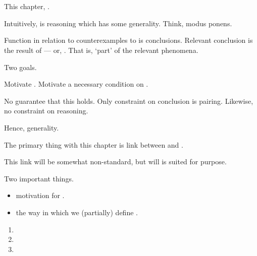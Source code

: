 \chapter{}
\label{cha:typical}

\begin{note}
  This chapter, \tR{}.

  Intuitively, \tR{} is reasoning which has some generality.
  Think, modus ponens.
\end{note}

\begin{note}
  Function in relation to counterexamples to \issueConstraint{} is conclusions.
  Relevant conclusion is the result of \tR{} --- or, \tR[concluding]{}.
  That is, `part' of the relevant phenomena.

  Two goals.

  Motivate \tR{}.
  Motivate a necessary condition on \tR{}.
\end{note}

\begin{note}
  No guarantee that this holds.
  Only constraint on conclusion is pairing.
  Likewise, no constraint on reasoning.

  Hence, generality.
\end{note}

\begin{note}
  The primary thing with this chapter is link between \tor{} and \tR{}.

  This link will be somewhat non-standard, but will is suited for purpose.
\end{note}

\begin{note}
  Two important things.

  \begin{itemize}
  \item
    motivation for \tR{}.
  \item
    the way in which we (partially) define \tR{}.
  \end{itemize}
\end{note}

\begin{note}
  \begin{enumerate}[label=]
  \item
  \item
  \item
  \end{enumerate}
\end{note}

